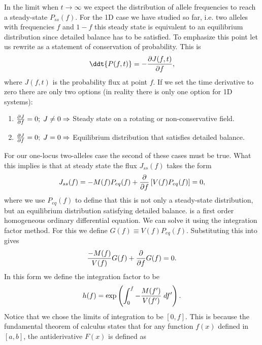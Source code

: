 In the limit when $t \rightarrow \infty$ we expect the distribution of allele
frequencies to reach a steady-state $P_{ss}(f)$. For the 1D case we have studied
so far, i.e. two alleles with frequencies $f$ and $1 - f$ this steady state is
equivalent to an equilibrium distribution since detailed balance has to be
satisfied. To emphasize this point let us rewrite  as
a statement of conservation of probability. This is
\begin{equation}
  \ddt{P(f, t)} = - {\partial J(f, t) \over \partial f},
\end{equation}
where $J(f, t)$ is the probability flux at point $f$. If we set the time
derivative to zero there are only two options (in reality there is only one
option for 1D systems):
\begin{enumerate}
  \item ${\partial J \over \partial f} = 0; \; J \neq 0 \Rightarrow$ Steady
  state on a rotating or non-conservative field.
  \item ${\partial J \over \partial f} = 0; \; J = 0 \Rightarrow$ Equilibrium
  distribution that satisfies detailed balance.
\end{enumerate}
For our one-locus two-alleles case the second of these cases must be true.
What this implies is that at steady state the flux $J_{ss}(f)$ takes the form
\begin{equation}
  J_{ss}(f) = - M(f) P_{eq}(f) + {\partial \over \partial f}
  \left[ V(f) P_{eq}(f) \right] = 0,
  \label{eq_flux_eq}
\end{equation}
where we use $P_{eq}(f)$ to define that this is not only a steady-state
distribution, but an equilibrium distribution satisfying detailed balance.
 is a first order homogeneous ordinary differential equation.
We can solve it using the integration factor method. For this we define
$G(f) \equiv V(f)P_{eq}(f)$. Substituting this into  gives
\begin{equation}
  {- M(f) \over V(f)} G(f) + {\partial \over \partial f} G(f) = 0.
  \label{eq_ode_ss}
\end{equation}
In this form we define the integration factor to be
\begin{equation}
  h(f) = \exp \left( \int_0^f -{M(f') \over V(f')} \; df' \right).
\end{equation}
Notice that we chose the limits of integration to be $[0, f]$. This is because
the fundamental theorem of calculus states that for any function $f(x)$ defined
in $[a, b]$, the antiderivative $F(x)$ is defined as
